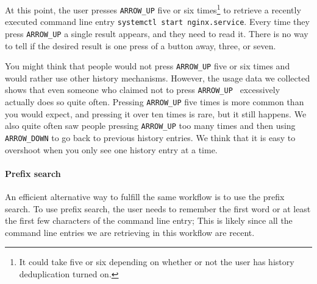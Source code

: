 At this point, the user presses \verb|ARROW_UP| five or six times\footnote{It could take five or six depending on whether or not the user has history deduplication turned on.} to retrieve a recently executed command line entry \verb|systemctl start nginx.service|. Every time they press \verb|ARROW_UP| a single result appears, and they need to read it. There is no way to tell if the desired result is one press of a button away, three, or seven. %



You might think that people would not press \verb|ARROW_UP| five or six times and would rather use other history mechanisms.
However, the usage data we collected shows that even someone who claimed not to press \verb|ARROW_UP | excessively actually does so quite often. Pressing \verb|ARROW_UP| five times is more common than you would expect, and pressing it over ten times is rare, but it still happens. We also quite often saw people pressing \verb|ARROW_UP| too many times and then using \verb|ARROW_DOWN| to go back to previous history entries. We think that it is easy to overshoot when you only see one history entry at a time.




\paragraph{Prefix search}

An efficient alternative way to fulfill the same workflow is to use the prefix search. To use prefix search, the user needs to remember the first word or at least the first few characters of the command line entry; This is likely since all the command line entries we are retrieving in this workflow are recent.

